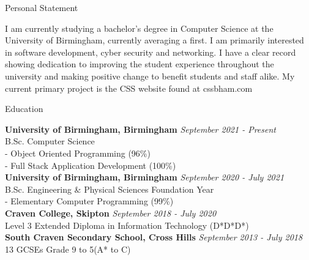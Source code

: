 \documentclass{resume} %
\begin{document}

\begin{rSection}{Personal Statement}

I am currently studying a bachelor's degree in Computer Science at the University of Birmingham, currently averaging a first. I am primarily interested in software development, cyber security and networking. I have a clear record showing dedication to improving the student experience throughout the university and making positive change to benefit students and staff alike. My current primary project is the CSS website found at cssbham.com 

\end{rSection}





\begin{rSection}{Education}

{\bf University of Birmingham, Birmingham} \hfill {\em September 2021 - Present} \\ 
B.Sc. Computer Science\\
- Object Oriented Programming (96\%)\\
- Full Stack Application Development (100\%)\\

{\bf University of Birmingham, Birmingham} \hfill {\em September 2020 - July 2021} \\ 
B.Sc. Engineering \& Physical Sciences Foundation Year\\
- Elementary Computer Programming (99\%) \\

{\bf Craven College, Skipton} \hfill {\em September 2018 - July 2020} \\
Level 3 Extended Diploma in Information Technology (D*D*D*) \\

{\bf South Craven Secondary School, Cross Hills} \hfill {\em September 2013 - July 2018} \\
13 GCSEs Grade 9 to 5(A* to C)

\end{rSection}
\end{document}
